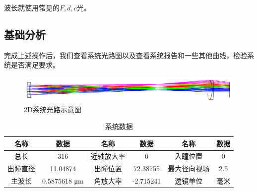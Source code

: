 \documentclass{article}
\begin{document}
  波长就使用常见的$F,d,c$光。
\subsection{基础分析}
完成上述操作后，我们查看系统光路图以及查看系统报告和一些其他曲线，检验系统是否满足要求。
\begin{figure}[H]
  \centering
  \includegraphics[width=18cm]{img/9.png}
\caption{2D系统光路示意图}
  \end{figure}
  \begin{table}[H]
    \centering
    \begin{tabular}{|cc|c c|cc|}
    \hline
    名称&数据&名称&数据& 名称&数据\\ \hline
    总长&316&近轴放大率&0&入瞳位置&0\\ 
    出瞳直径& 11.04874&出瞳位置&72.38755&最大径向视场 &2.5\\
    主波长&0.5875618 μm&角放大率&-2.715241&透镜单位&毫米\\ 
    \hline
    \end{tabular}
    \caption{系统数据}
    \end{table}
\end{document}
